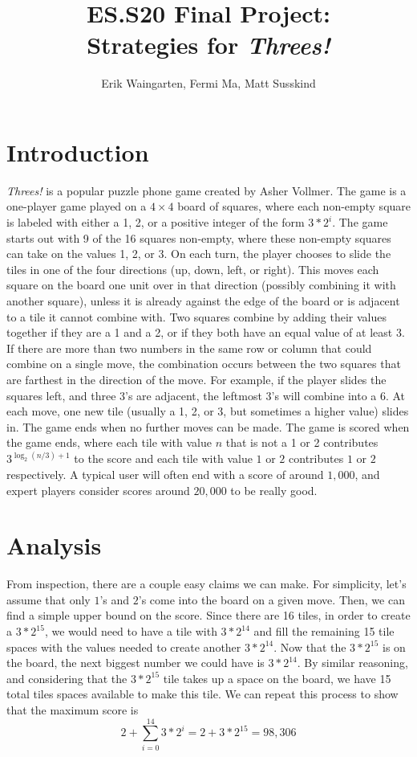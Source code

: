 \documentclass[11pt]{article}
\author{Erik Waingarten, Fermi Ma, Matt Susskind}
\title{ES.S20 Final Project: \\
Strategies for \emph{Threes!}}
\begin{document}
         
\maketitle

\section{Introduction}

\emph{Threes!} is a popular puzzle phone game created by Asher Vollmer. The game is a one-player game played on a $4 \times 4$ board of squares, where each non-empty square is labeled with either a 1, 2, or a positive integer of the form $3*2^i$. The game starts out with 9 of the 16 squares non-empty, where these non-empty squares can take on the values 1, 2, or 3. On each turn, the player chooses to slide the tiles in one of the four directions (up, down, left, or right). This moves each square on the board one unit over in that direction (possibly combining it with another square), unless it is already against the edge of the board or is adjacent to a tile it cannot combine with. Two squares combine by adding their values together if they are a 1 and a 2, or if they both have an equal value of at least 3. If there are more than two numbers in the same row or column that could combine on a single move, the combination occurs between the two squares that are farthest in the direction of the move. For example, if the player slides the squares left, and three 3's are adjacent, the leftmost 3's will combine into a 6. At each move, one new tile (usually a 1, 2, or 3, but sometimes a higher value) slides in. The game ends when no further moves can be made. The game is scored when the game ends, where each tile with value $n$ that is not a 1 or 2 contributes $3^{\log_2(n/3)+1}$ to the score and  each tile with value $1$ or $2$ contributes $1$ or $2$ respectively. A typical user will often end with a score of around $1,000$, and expert players consider scores around $20,000$ to be really good.

\section{Analysis}

From inspection, there are a couple easy claims we can make. For simplicity, let's assume that only $1$'s and $2$'s come into the board on a given move. Then, we can find a simple upper bound on the score. Since there are 16 tiles, in order to create a $3*2^{15}$, we would need to have a tile with $3*2^{14}$ and fill the remaining 15 tile spaces with the values needed to create another $3*2^{14}$. Now that the $3*2^{15}$ is on the board, the next biggest number we could have is $3*2^{14}$. By similar reasoning, and considering that the $3*2^{15}$ tile takes up a space on the board, we have 15 total tiles spaces available to make this tile. We can repeat this process to show that the maximum score is
\[ 2 + \sum_{i=0}^14 3*2^{i} = 2 + 3*2^{15} = 98,306 \]
\end{document}
